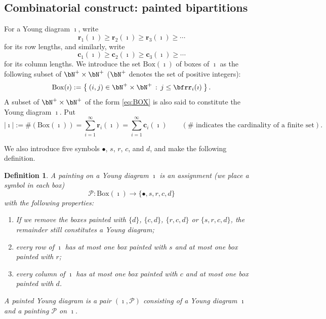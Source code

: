 \documentclass[11pt,a4paper]{amsart}
\def\abs#1{\left|{#1}\right|}
\newcommand{\CP}{{\mathcal {P}}}
\numberwithin{equation}{section}
\newtheorem{defn}[thm]{Definition}
\theoremstyle{remark}
\def\BOX{\mathrm{Box}}
\begin{document}
\subsection{Combinatorial construct: painted bipartitions}
\label{sec:PB}

For a Young diagram $\imath$, write
\[
 \mathbf r_1(\imath)\geq \mathbf r_2(\imath)\geq \mathbf r_3(\imath)\geq \cdots
\]
for its row lengths, and similarly,
write
\[
 \mathbf c_1(\imath)\geq \mathbf c_2(\imath)\geq \mathbf c_3(\imath)\geq \cdots
\]
for its column lengths.
We introduce the set $\BOX(\imath)$ of boxes of $\imath$ as the following subset
of $\bN^+\times \bN^+$ ($\bN^+$ denotes the set of positive integers):
\begin{equation}\label{eq:BOX}
\BOX(\imath):=\Set{(i,j)\in\bN^+\times \bN^+ \,:\, j\leq \bfrr_i(\imath)}.
\end{equation}
A subset of $\bN^+\times \bN^+$ of the form \eqref{eq:BOX} is also said to constitute the Young diagram $\imath$. Put
\begin{equation}\label{eq:BOX22}
\abs{\imath}:=\#(\BOX(\imath))=\sum_{i=1}^\infty \mathbf r_i(\imath)=\sum_{i=1}^\infty \mathbf c_i(\imath)\qquad (\textrm{$\#$ indicates the cardinality of a finite set}).
\end{equation}

We also introduce five symbols $\bullet$, $s$, $r$, $c$, and $d$, and make the following definition.

\begin{defn}
A painting on a Young diagram $\imath$ is an assignment (we
    place a symbol in each box)
  \[
    \mathcal P: \mathrm{Box}(\imath) \rightarrow \{\bullet, s, r, c, d \}
  \]
  with the following properties:
  \begin{enumerate}
  \item If we remove the boxes painted with $\{d\}$,
$\{c,d\}$, $\{r,c,d\}$ or $\{s,r,c,d\}$, the remainder still constitutes a Young diagram; 
    \item every row of $\imath$ has at most one box
          painted with $s$ and at most one box painted with $r$;    
    \item every column of $\imath$ has at most one
          box painted with $c$ and at most one box painted with $d$.    
  \end{enumerate}
A painted Young diagram is a pair $(\imath, \CP)$ consisting of a Young diagram $\imath$ and a painting $\CP$ on $\imath$.
\end{defn}
\end{document}
